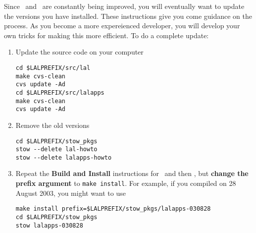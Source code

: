 Since \lal\ and \lalapps\ are constantly being improved,  you will
eventually want to update the versions you have installed.   These
instructions give you come guidance on the process.   As you become a
more expereienced developer,  you will develop your own tricks for
making this more efficient.    To do a complete update:
\begin{enumerate}
\item Update the source code on your computer
\begin{verbatim}
cd $LALPREFIX/src/lal
make cvs-clean
cvs update -Ad
cd $LALPREFIX/src/lalapps
make cvs-clean
cvs update -Ad
\end{verbatim}

\item Remove the old versions
\begin{verbatim}
cd $LALPREFIX/stow_pkgs
stow --delete lal-howto
stow --delete lalapps-howto
\end{verbatim}

\item Repeat the \textbf{Build and Install} instructions for \lal\ and then
\lalapps,  but \textbf{change the prefix argument} to \verb+make install+.   
For example,   if you compiled on 28 August 2003,  you might want to use
\begin{verbatim}
make install prefix=$LALPREFIX/stow_pkgs/lalapps-030828
cd $LALPREFIX/stow_pkgs
stow lalapps-030828
\end{verbatim}

\end{enumerate}
